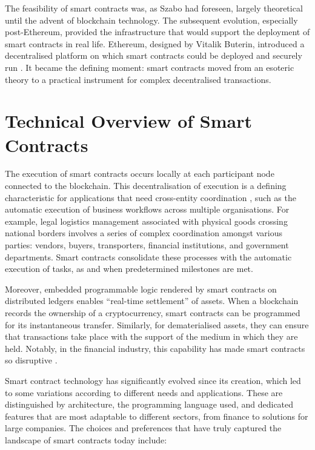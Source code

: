 The feasibility of smart contracts was, as Szabo had foreseen, largely theoretical until the advent of blockchain technology. The subsequent evolution, especially post-Ethereum, provided the infrastructure that would support the deployment of smart contracts in real life. Ethereum, designed by Vitalik Buterin, introduced a decentralised platform on which smart contracts could be deployed and securely run \cite{Buterin2014}. It became the defining moment: smart contracts moved from an esoteric theory to a practical instrument for complex decentralised transactions.

\section{Technical Overview of Smart Contracts}

The execution of smart contracts occurs locally at each participant node connected to the blockchain. This decentralisation of execution is a defining characteristic for applications that need cross-entity coordination \cite{MagazzeniEtAl2017}, such as the automatic execution of business workflows across multiple organisations. For example, legal logistics management associated with physical goods crossing national borders involves a series of complex coordination amongst various parties: vendors, buyers, transporters, financial institutions, and government departments. Smart contracts consolidate these processes with the automatic execution of tasks, as and when predetermined milestones are met.

Moreover, embedded programmable logic rendered by smart contracts on distributed ledgers enables ``real-time settlement'' of assets. When a blockchain records the ownership of a cryptocurrency, smart contracts can be programmed for its instantaneous transfer. Similarly, for dematerialised assets, they can ensure that transactions take place with the support of the medium in which they are held. Notably, in the financial industry, this capability has made smart contracts so disruptive \cite{MagazzeniEtAl2017, Smith2020}.

Smart contract technology has significantly evolved since its creation, which led to some variations according to different needs and applications. These are distinguished by architecture, the programming language used, and dedicated features that are most adaptable to different sectors, from finance to solutions for large companies. The choices and preferences that have truly captured the landscape of smart contracts today include:

